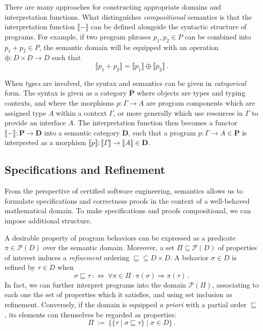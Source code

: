 \documentclass[sigplan,10pt,authordraft]{acmart}
\newcommand{\bdot}{\cdot}
\begin{document}
There are many approaches
for constructing appropriate domains
and interpretation functions.
What distinguishes \emph{compositional} semantics
is that the interpretation function $\llbracket - \rrbracket$
can be defined alongside the syntactic structure of programs.
For example,
if two program phrases $p_1, p_2 \in P$
can be combined into $p_1 + p_2 \in P$,
the semantic domain will be equipped with an operation
$\oplus : D \times D \rightarrow D$
such that
\[
  \llbracket p_1 + p_2 \rrbracket =
  \llbracket p_1 \rrbracket \oplus
  \llbracket p_2 \rrbracket
  \,.
\]

When \emph{types} are involved,
the syntax and semantics
can be given in \emph{categorical} form.
The syntax is given as a category $\mathbf{P}$
where objects are types and typing contexts,
and where the morphisms $p : \Gamma \rightarrow A$
are program components which
are assigned type $A$ within a context $\Gamma$,
or more generally
which use resources in $\Gamma$ to provide an interface $A$.
The interpretation function
then becomes a functor
$\llbracket - \rrbracket : \mathbf{P} \rightarrow \mathbf{D}$
into a semantic category $\mathbf{D}$,
such that a program $p : \Gamma \rightarrow A \in \mathbf{P}$
is interpreted as
a morphism
$\llbracket p \rrbracket :
 \llbracket \Gamma \rrbracket \rightarrow
 \llbracket A \rrbracket
 \in \mathbf{D}$.


\subsection{Specifications and Refinement} \label{sec:specs} %

From the perspective of certified software engineering,
semantics allows us to formulate specifications and
correctness proofs
in the context of a well-behaved mathematical domain.
To make specifications and proofs compositional,
we can impose additional structure.

A desirable property of program behaviors
can be expressed as a predicate $\pi \in \mathcal{P}(D)$
over the semantic domain.
Moreover,
a set $\Pi \subseteq \mathcal{P}(D)$
of properties of interest
induces a \emph{refinement} ordering
${\sqsubseteq} \subseteq D \times D$.
A behavior $\sigma \in D$ is refined by $\tau \in D$
when %
\[
  \sigma \sqsubseteq \tau \: :\Leftrightarrow \:
  \forall \pi \in \Pi \bdot
  \pi(\sigma) \Rightarrow \pi(\tau)
  \,.
\]
In fact, we can further interpret programs
into the domain $\mathcal{P}(\Pi)$,
associating to each one the set of properties
which it satisfies,
and using set inclusion as refinement.
%
Conversely,
if the domain is equipped \emph{a priori}
with a partial order $\sqsubseteq$,
its elements can themselves be regarded as properties:
\[
  \Pi \: := \:
    \{ \{ \tau \mid \sigma \sqsubseteq \tau \} \mid
       \sigma \in D \}
  \,.
\]
\end{document}
